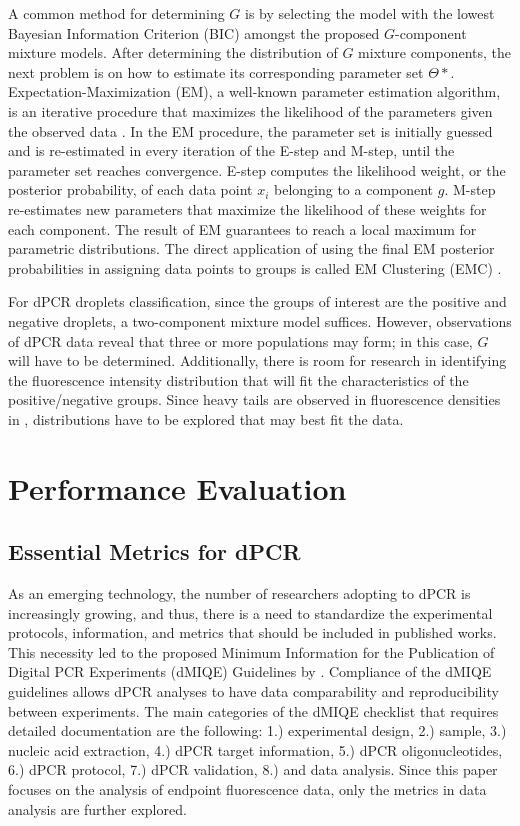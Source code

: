 A common method for determining \(G\) is by selecting the model with the lowest Bayesian Information Criterion (BIC) amongst the proposed \(G\)-component mixture models. After determining the distribution of \(G\) mixture components, the next problem is on how to estimate its corresponding parameter set \(\Theta*\). Expectation-Maximization (EM), a well-known parameter estimation algorithm, is an iterative procedure that maximizes the likelihood of the parameters given the observed data \cite{Garriga2016}. In the EM procedure, the parameter set is initially guessed and is re-estimated in every iteration of the E-step and M-step, until the parameter set reaches convergence. E-step computes the likelihood weight, or the posterior probability, of each data point \(x_i\) belonging to a component \(g\). M-step re-estimates new parameters that maximize the likelihood of these weights for each component. The result of EM guarantees to reach a local maximum for parametric distributions. The direct application of using the final EM posterior probabilities in assigning data points to groups is called EM Clustering (EMC) \cite{Garriga2016}. 

For dPCR droplets classification, since the groups of interest are the positive and negative droplets, a two-component mixture model suffices. However, observations of dPCR data reveal that three or more populations may form; in this case, \(G\) will have to be determined. Additionally, there is room for research in identifying the fluorescence intensity distribution that will fit the characteristics of the positive/negative groups. Since heavy tails are observed in fluorescence densities in , distributions have to be explored that may best fit the data. 


\section{Performance Evaluation}
\label{sec:ch2_perfeval_estimates}

\subsection{Essential Metrics for dPCR}
\label{sec:ch2_perfeval_essentialMetrics}
As an emerging technology, the number of researchers adopting to dPCR is increasingly growing, and thus, there is a need to standardize the experimental protocols, information, and metrics that should be included in published works. This necessity led to the proposed Minimum Information for the Publication of Digital PCR Experiments (dMIQE) Guidelines by . Compliance of the dMIQE guidelines allows dPCR analyses to have data comparability and reproducibility between experiments. The main categories of the dMIQE checklist that requires detailed documentation are the following: 1.) experimental design, 2.) sample, 3.) nucleic acid extraction, 4.) dPCR target information, 5.) dPCR oligonucleotides, 6.) dPCR protocol, 7.) dPCR validation, 8.) and data analysis. Since this paper focuses on the analysis of endpoint fluorescence data, only the metrics in data analysis are further explored.

